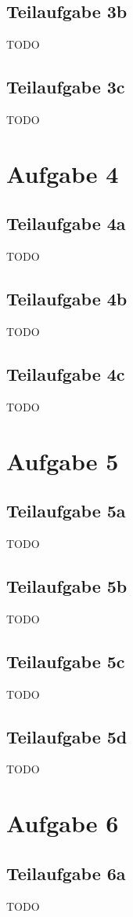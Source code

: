 \documentclass[a4paper]{scrartcl}
\begin{document}
\subsection*{Teilaufgabe 3b}
TODO
\subsection*{Teilaufgabe 3c}
TODO

\section*{Aufgabe 4}
\subsection*{Teilaufgabe 4a}
TODO
\subsection*{Teilaufgabe 4b}
TODO
\subsection*{Teilaufgabe 4c}
TODO

\section*{Aufgabe 5}
\subsection*{Teilaufgabe 5a}
TODO
\subsection*{Teilaufgabe 5b}
TODO
\subsection*{Teilaufgabe 5c}
TODO
\subsection*{Teilaufgabe 5d}
TODO

\section*{Aufgabe 6}
\subsection*{Teilaufgabe 6a}
TODO
\end{document}
